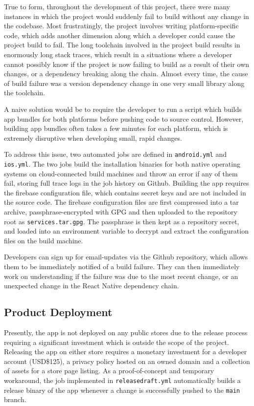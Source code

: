 True to form, throughout the development of this project, there were many instances in which the project would suddenly fail to build without any change in the codebase. Most frustratingly, the project involves writing platform-specific code, which adds another dimension along which a developer could cause the project build to fail. The long toolchain involved in the project build results in enormously long stack traces, which result in a situations where a developer cannot possibly know if the project is now failing to build as a result of their own changes, or a dependency breaking along the chain. Almost every time, the cause of build failure was a version dependency change in one very small library along the toolchain.

A naive solution would be to require the developer to run a script which builds app bundles for both platforms before pushing code to source control. However, building app bundles often takes a few minutes for each platform, which is extremely disruptive when developing small, rapid changes.

To address this issue, two automated jobs are defined in \texttt{android.yml} and \texttt{ios.yml}. The two jobs build the installation binaries for both native operating systems on cloud-connected build machines and throw an error if any of them fail, storing full trace logs in the job history on Github. Building the app requires the firebase configuration file, which contains secret keys and are not included in the source code. The firebase configuration files are first compressed into a tar archive, passphrase-encrypted with GPG and then uploaded to the repository root as \texttt{services.tar.gpg}. The passphrase is then kept as a repository secret, and loaded into an environment variable to decrypt and extract the configuration files on the build machine.

Developers can sign up for email-updates via the Github repository, which allows them to be immediately notified of a build failure. They can then immediately work on understanding if the failure was due to the most recent change, or an unexpected change in the React Native dependency chain.


\subsection{Product Deployment}
Presently, the app is not deployed on any public stores due to the release process requiring a significant investment which is outside the scope of the project. Releasing the app on either store requires a monetary investment for a developer account (USD\$125), a privacy policy hosted on an owned domain and a collection of assets for a store page listing. As a proof-of-concept and temporary workaround, the job implemented in \texttt{releasedraft.yml} automatically builds a release binary of the app whenever a change is successfully pushed to the \texttt{main} branch.

